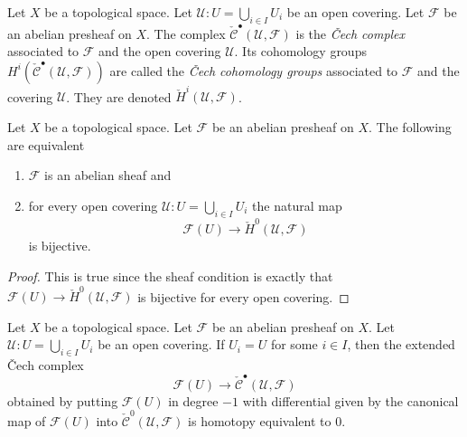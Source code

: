 \begin{definition}
\label{definition-cech-complex}
\begin{reference}
\cite[Chapter I, \S 3, nos. 18 and 20, pp. 212--213]{FAC}
\end{reference}
Let $X$ be a topological space.
Let $\mathcal{U} : U = \bigcup_{i \in I} U_i$ be an open covering.
Let $\mathcal{F}$ be an abelian presheaf on $X$.
The complex $\check{\mathcal{C}}^\bullet(\mathcal{U}, \mathcal{F})$
is the {\it {\v C}ech complex} associated to $\mathcal{F}$ and the
open covering $\mathcal{U}$. Its cohomology groups
$H^i(\check{\mathcal{C}}^\bullet(\mathcal{U}, \mathcal{F}))$ are
called the {\it {\v C}ech cohomology groups} associated to
$\mathcal{F}$ and the covering $\mathcal{U}$.
They are denoted $\check H^i(\mathcal{U}, \mathcal{F})$.
\end{definition}

\begin{lemma}
\label{lemma-cech-h0}
\begin{reference}
\cite[Chapter I, \S 3, no. 20, Proposition 1, p. 213]{FAC}
\end{reference}
Let $X$ be a topological space.
Let $\mathcal{F}$ be an abelian presheaf on $X$.
The following are equivalent
\begin{enumerate}
\item $\mathcal{F}$ is an abelian sheaf and
\item for every open covering $\mathcal{U} : U = \bigcup_{i \in I} U_i$
the natural map
$$
\mathcal{F}(U) \to \check{H}^0(\mathcal{U}, \mathcal{F})
$$
is bijective.
\end{enumerate}
\end{lemma}

\begin{proof}
This is true since the sheaf condition is exactly that
$\mathcal{F}(U) \to \check{H}^0(\mathcal{U}, \mathcal{F})$
is bijective for every open covering.
\end{proof}

\begin{lemma}
\label{lemma-cech-trivial}
\begin{reference}
\cite[Chapter I, \S 4, no. 29, Lemma 1, p. 221]{FAC}
\end{reference}
Let $X$ be a topological space. Let $\mathcal{F}$ be an abelian presheaf on $X$.
Let $\mathcal{U} : U = \bigcup_{i \in I} U_i$ be an open covering. If
$U_i = U$ for some $i \in I$, then the extended {\v C}ech complex
$$
\mathcal{F}(U) \to \check{\mathcal{C}}^\bullet(\mathcal{U}, \mathcal{F})
$$
obtained by putting $\mathcal{F}(U)$ in degree $-1$ with differential given by
the canonical map of $\mathcal{F}(U)$ into
$\check{\mathcal{C}}^0(\mathcal{U}, \mathcal{F})$
is homotopy equivalent to $0$.
\end{lemma}

